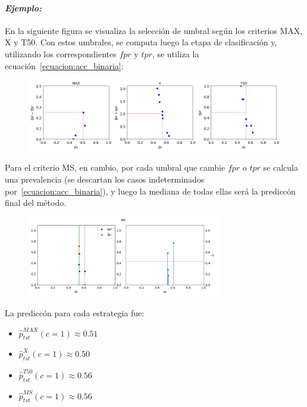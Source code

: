 \paragraph{\it Ejemplo:\/} En la siguiente figura se visualiza la selección de
umbral según los criterios MAX, X y T50. Con estos umbrales, se computa luego la
etapa de clasificación y, utilizando los correspondientes $fpr$ y $tpr$, se
utiliza la ecuación~\ref{ecuacion:acc_binaria}:
\begin{figure}[H]
    \includegraphics[width=\textwidth]{../plots_teoria/seleccion_umbrales_max_x_t50.png}
    \caption{}\label{fig:seleccion_umbrales_max_x_t50}
\end{figure}
Para el criterio MS, en cambio, por cada umbral que cambie $fpr$ o $tpr$ se
calcula una prevalencia (se descartan los casos indeterminados
por~\ref{ecuacion:acc_binaria}), y luego la mediana de todas ellas será la
prediccón final del método.
\begin{figure}[H]
    \centerline{\includegraphics[width=0.75\textwidth]{../plots_teoria/seleccion_umbrales_ms.png}}
    \caption{}\label{fig:seleccion_umbrales_ms}
\end{figure}
La prediccón para cada estrategia fue:
\begin{itemize}
    \item $\hat p^{MAX}_{tst}(c=1) \approx  0.51$
    \item $\hat p^{X}_{tst}(c=1) \approx  0.50$
    \item $\hat p^{T50}_{tst}(c=1) \approx  0.56$
    \item $\hat p^{MS}_{tst}(c=1) \approx  0.56$
\end{itemize}
